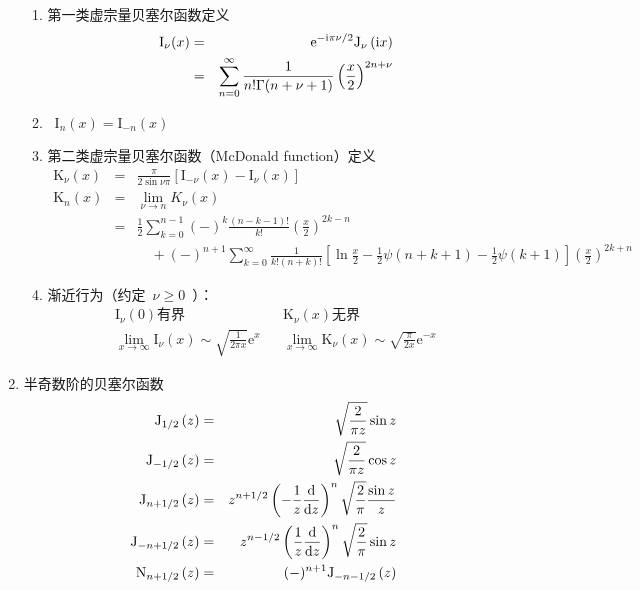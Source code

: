 \documentclass[12pt,a4paper]{article}
\newcommand\dif{\mathrm{d}}
\renewcommand{\[}{\ $\displaystyle}
\renewcommand{\]}{$\ }%
\newcommand{\fdif}[2]{\ensuremath{\frac{\dif #1}{\dif #2}}}
\newcommand\mi{\mathrm{i}}
\newcommand\e{\mathrm{e}}
\newcommand{\summ}[2][n]{\sum_{#1=#2}^\infty}
\begin{document}
\begin{enumerate}
\begin{enumerate}
	     	\item 第一类虚宗量贝塞尔函数定义
	     	\begin{eqnarray*}
	     	  \mathrm I_\nu(x) &=& \e^{-\mi\pi\nu/2}\fj{\mi x} \\
	     	    &=& \summ{0} \frac{1}{n!\Gamma(n+\nu+1)}\left(\frac x2\right)^{2n+\nu}
	     	\end{eqnarray*}
	     \item \[\mathrm I_n(x) = \mathrm I_{-n}(x)\]
	     \item 第二类虚宗量贝塞尔函数（McDonald function）定义
	     	\begin{eqnarray*}
	     	  \mathrm K_\nu (x) &=&\frac \pi{2\sin\nu\pi}\left[\mathrm I_{-\nu}(x) - \mathrm I_\nu(x)\right]\\
	     	  \mathrm K_n(x) &=& \lim_{\nu\to n}K_\nu(x) \\
	     	    &=&\frac 12\sum_{k=0}^{n-1}(-)^k\frac{(n-k-1)!}{k!}\left(\frac x2\right)^{2k-n} \\
	     	      &&\quad + (-)^{n+1}\sum_{k=0}^\infty \frac 1{k!(n+k)!}\left[\ln \frac x2 - \frac 12\psi(n+k+1) - \frac 12\psi(k+1)\right]\left(\frac x2\right)^{2k+n}
	     	\end{eqnarray*}
	     \item 渐近行为（约定\[\nu\ge 0\]）：
	       \begin{eqnarray*}
	         \mathrm I_\nu(0) \mbox{有界} && \mathrm K_\nu(x)\mbox{无界}	\\
	         \lim_{x\to \infty} \mathrm I_\nu(x)\sim \sqrt{\frac 1{2\pi x}}\e^x &&
	         \lim_{x\to \infty} \mathrm K_\nu(x)\sim \sqrt{\frac \pi{2x}}\e^{-x}
	       \end{eqnarray*}
	   	   \end{enumerate}
	     \item 半奇数阶的贝塞尔函数
	     	\begin{eqnarray*}
	     	  \fj[1/2]{z} &=& \sqrt{\frac 2{\pi z}}\sin z \\
	     	  \fj[-1/2]{z} &=& \sqrt{\frac 2{\pi z}}\cos z \\
	     	  \fj[n+1/2]{z} &=& z^{n+1/2} \left(-\frac 1z\fdif{}{z}\right)^n\sqrt{\frac 2\pi}\frac{\sin z}{z} \\
	     	  \fj[-n+1/2]{z} &=& z^{n-1/2} \left(\frac 1z\fdif{}{z}\right)^n\sqrt{\frac 2\pi}\sin z \\
	     	  \fn[n+1/2]{z} &=&(-)^{n+1}\fj[-n-1/2]{z}
	     	\end{eqnarray*}
	   \end{enumerate}
	   
\end{document}

